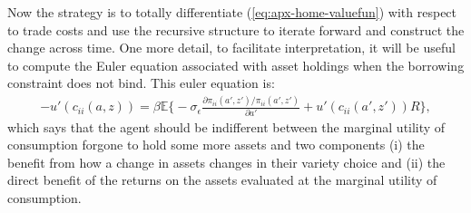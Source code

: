 \documentclass[12pt,pdftex]{article}
\begin{document}
\begin{onehalfspacing}
Now the strategy is to totally differentiate (\ref{eq:apx-home-valuefun}) with respect to trade costs and use the recursive structure to iterate forward and construct the change across time.  One more detail, to facilitate interpretation, it will be useful to compute the Euler equation associated with asset holdings when the borrowing constraint does not bind. This euler equation is:
\begin{align}
-u'(c_{ii}(a,z)) = \beta \mathbb{E} \bigg \{ -\sigma_{\epsilon} \frac{\partial \pi_{ii}(a',z') / \pi_{ii}(a',z')}{\partial a'} + u'(c_{ii}(a',z'))R \bigg \},
\end{align}
which says that the agent should be indifferent between the marginal utility of consumption forgone to hold some more assets and two components (i) the benefit from how a change in assets changes in their variety choice and (ii) the direct benefit of the returns on the assets evaluated at the marginal utility of consumption.

%
%


\end{onehalfspacing}
\end{document}
